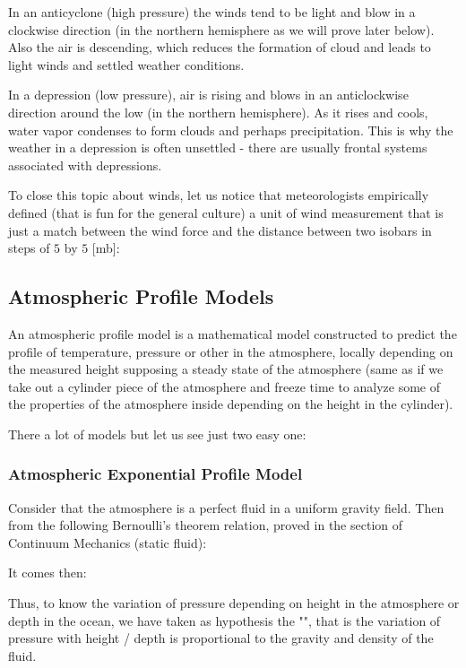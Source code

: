 	In an anticyclone (high pressure) the winds tend to be light and blow in a clockwise direction (in the northern hemisphere as we will prove later below). Also the air is descending, which reduces the formation of cloud and leads to light winds and settled weather conditions.

	In a depression (low pressure), air is rising and blows in an anticlockwise direction around the low (in the northern hemisphere). As it rises and cools, water vapor condenses to form clouds and perhaps precipitation. This is why the weather in a depression is often unsettled - there are usually frontal systems associated with depressions.
	
	To close this topic about winds, let us notice that meteorologists empirically defined (that is fun for the general culture) a unit of wind measurement that is just a match between the wind force and the distance between two isobars in steps of $5$ by $5$ [mb]:
	
	
	\subsection{Atmospheric Profile Models}
	An atmospheric profile model is a mathematical model constructed to predict the profile of temperature, pressure or other in the atmosphere, locally depending on the measured height supposing a steady state of the atmosphere (same as if we take out a cylinder piece of the atmosphere and freeze time to analyze some of the properties of the atmosphere inside depending on the height in the cylinder). 

	There a lot of models but let us see just two easy one:
	
	\subsubsection{Atmospheric Exponential Profile Model}
	Consider that the atmosphere is a perfect fluid in a uniform gravity field. Then from the following Bernoulli's theorem relation, proved in the section of Continuum Mechanics (static fluid):
	
	It comes then:
	
	Thus, to know the variation of pressure depending on height in the atmosphere or depth in the ocean, we have taken as hypothesis the "", that is the variation of pressure with height / depth is proportional to the gravity and density of the fluid.
	
